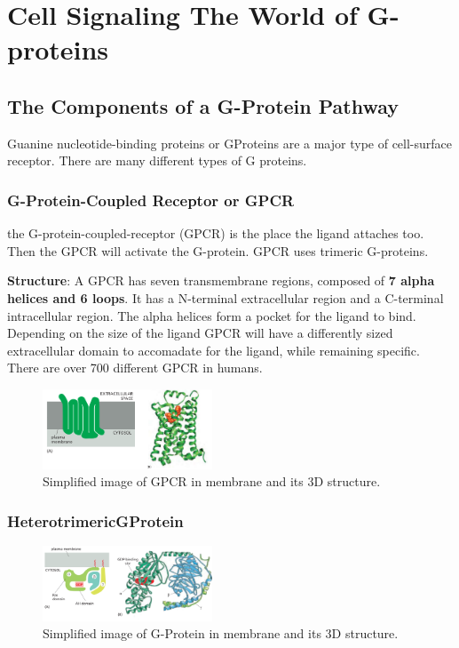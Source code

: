\documentclass[../main.tex]{subfiles}
\begin{document}
\section{Cell Signaling The World of G-proteins}

\subsection{The Components of a G-Protein Pathway}

Guanine nucleotide-binding proteins or \gls{GProteins} are a major type of cell-surface receptor. There are many different types of G proteins.

\subsubsection{G-Protein-Coupled Receptor or GPCR}

the G-protein-coupled-receptor (\gls{GPCR}) is the place the ligand attaches too. Then the GPCR will activate the G-protein. GPCR uses trimeric G-proteins.

\textbf{Structure}: A GPCR has seven transmembrane regions, composed of \textbf{7 alpha helices and 6 loops}. It has a N-terminal extracellular region and a C-terminal intracellular region. The alpha helices form a pocket for the ligand to bind. Depending on the size of the ligand GPCR will have a differently sized extracellular domain to accomadate for the ligand, while remaining specific. There are over 700 different GPCR in humans.

\begin{figure}[H]
	\centering
	\includegraphics[width=0.45\textwidth]{GPCR}
	\caption{Simplified image of GPCR in membrane and its 3D structure.}
\end{figure}

\subsubsection{\gls{HeterotrimericGProtein}}

\begin{figure}[H]
	\centering
	\includegraphics[width=0.45\textwidth]{G_structure}
	\caption{Simplified image of G-Protein in membrane and its 3D structure.}
\end{figure}
\end{document}
